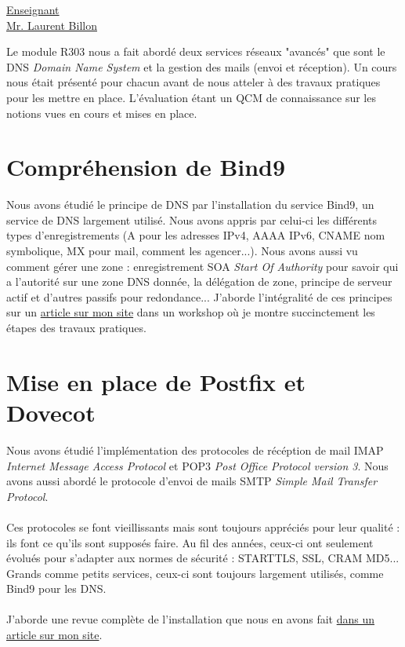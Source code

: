 \renewcommand{\figurename}{}

\vspace*{0.2cm}%
      \large
      \href{\@orientadorPagina}{\color{black}Enseignant\\Mr. Laurent Billon}\\%
\vspace*{0.5cm}%

Le module R303 nous a fait abordé deux services réseaux "avancés" que sont le DNS \textit{Domain Name System} et la gestion des mails (envoi et réception). Un cours nous était présenté pour chacun avant de nous atteler à des travaux pratiques pour les mettre en place. L'évaluation étant un QCM de connaissance sur les notions vues en cours et mises en place.

\section{Compréhension de Bind9}

Nous avons étudié le principe de DNS par l'installation du service Bind9, un service de DNS largement utilisé. Nous avons appris par celui-ci les différents types d'enregistrements (A pour les adresses IPv4, AAAA IPv6, CNAME nom symbolique, MX pour mail, comment les agencer...). Nous avons aussi vu comment gérer une zone : enregistrement SOA \textit{Start Of Authority} pour savoir qui a l'autorité sur une zone DNS donnée, la délégation de zone, principe de serveur actif et d'autres passifs pour redondance... J'aborde l'intégralité de ces principes sur un \href{https://xeylou.fr/posts/bind9-workshop/}{article sur mon site} dans un workshop où je montre succinctement les étapes des travaux pratiques.

\section{Mise en place de Postfix et Dovecot}

Nous avons étudié l'implémentation des protocoles de récéption de mail IMAP \textit{Internet Message Access Protocol} et POP3 \textit{Post Office Protocol version 3}. Nous avons aussi abordé le protocole d'envoi de mails SMTP \textit{Simple Mail Transfer Protocol}.
\\ \\
Ces protocoles se font vieillissants mais sont toujours appréciés pour leur qualité : ils font ce qu'ils sont supposés faire. Au fil des années, ceux-ci ont seulement évolués pour s'adapter aux normes de sécurité : STARTTLS, SSL, CRAM MD5... Grands comme petits services, ceux-ci sont toujours largement utilisés, comme Bind9 pour les DNS.
\\ \\
J'aborde une revue complète de l'installation que nous en avons fait \href{https://xeylou.fr/posts/postfix-workshop/}{dans un article sur mon site}.

